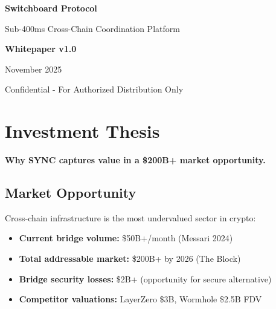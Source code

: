 \documentclass[12pt,a4paper]{article}
\begin{document}
\begin{titlepage}
\centering
\vspace*{2cm}
{\Huge\bfseries\color{primary} Switchboard Protocol\par}
\vspace{0.5cm}
{\Large Sub-400ms Cross-Chain Coordination Platform\par}
\vspace{2cm}
{\large\textbf{Whitepaper v1.0}\par}
\vspace{1cm}
{\large November 2025\par}
\vspace{3cm}

\begin{abstract}
Switchboard introduces a revolutionary cross-chain coordination protocol achieving sub-400ms latency through novel state oracle architecture and optimistic execution mechanisms. This whitepaper presents the technical architecture, tokenomics model, and utility framework that enables trustless, high-performance multi-chain operations. The SYNC token serves as the coordination layer for staking, governance, and fee distribution across the ecosystem.
\end{abstract}

\vfill
{\small Confidential - For Authorized Distribution Only\par}
\end{titlepage}

\tableofcontents
\newpage

\section{Investment Thesis}

\textbf{Why SYNC captures value in a \$200B+ market opportunity.}

\subsection{Market Opportunity}

Cross-chain infrastructure is the most undervalued sector in crypto:

\begin{itemize}
    \item \textbf{Current bridge volume:} \$50B+/month (Messari 2024)
    \item \textbf{Total addressable market:} \$200B+ by 2026 (The Block)
    \item \textbf{Bridge security losses:} \$2B+ (opportunity for secure alternative)
    \item \textbf{Competitor valuations:} LayerZero \$3B, Wormhole \$2.5B FDV
\end{itemize}
\end{document}
